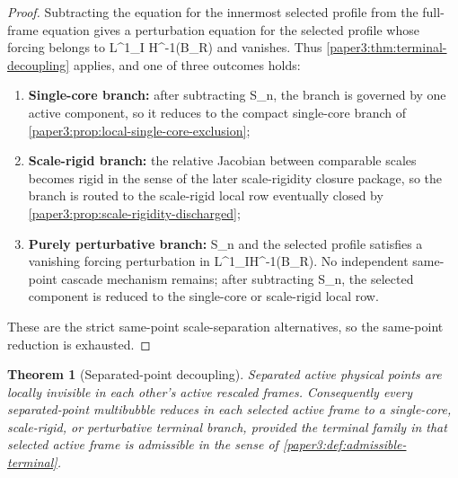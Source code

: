 \documentclass[11pt]{amsart}
\def\({}%
\def\){}%
\theoremstyle{plain}
\newtheorem{theorem}{Theorem}[section]
\theoremstyle{definition}
\theoremstyle{remark}
\begin{document}
\begin{proof}
Subtracting the equation for the innermost selected profile from the full-frame
equation gives a perturbation equation for the selected profile whose forcing
belongs to \(L^1_I H^{-1}(B_R)\) and vanishes.  Thus
\cref{paper3:thm:terminal-decoupling} applies, and one of three outcomes holds:
\begin{enumerate}[label=\textup{(\alph*)}]
\item \textbf{Single-core branch:}
  after subtracting \(S_n\), the branch is governed by one active component, so it
  reduces to the compact single-core branch of \cref{paper3:prop:local-single-core-exclusion};
\item \textbf{Scale-rigid branch:}
  the relative Jacobian between comparable scales becomes rigid in the sense of
  the later scale-rigidity closure package, so the branch is routed to the
  scale-rigid local row eventually closed by
  \cref{paper3:prop:scale-rigidity-discharged};
\item \textbf{Purely perturbative branch:}
  \(S_n\) and the selected profile satisfies a vanishing forcing perturbation
  in \(L^1_IH^{-1}(B_R)\).  No independent same-point cascade mechanism remains;
  after subtracting \(S_n\), the selected component is reduced to the single-core
  or scale-rigid local row.
\end{enumerate}

These are the strict same-point scale-separation alternatives, so the
same-point reduction is exhausted.
\end{proof}


\begin{theorem}[Separated-point decoupling]\label{paper3:thm:separated-point-reduction}
Separated active physical points are locally invisible in each other's active
rescaled frames.  Consequently every separated-point multibubble reduces in each
selected active frame to a single-core, scale-rigid, or perturbative terminal
branch, provided the terminal family in that selected active frame is
admissible in the sense of \cref{paper3:def:admissible-terminal}.
\end{theorem}
\end{document}
